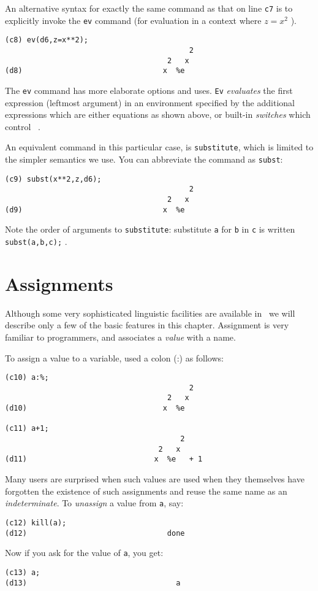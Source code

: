 An alternative syntax for exactly the same command as that on line {\tt c7}
is to explicitly invoke the {\tt ev} command (for evaluation in a context
where $ z = x^2 $ ).
\begin{verbatim}
(c8) ev(d6,z=x**2);
                                          2
                                     2   x
(d8)                                x  %e
\end{verbatim}

The {\tt ev} command has more elaborate options and uses. {\tt Ev} 
{\it evaluates} the first expression (leftmost argument) in an environment 
specified by the additional expressions which are either equations as shown 
above, or built-in {\it switches} which control \Max\ .

An equivalent command in this particular case, is {\tt substitute},
which is limited to the simpler semantics we use.  You can abbreviate
the command as {\tt subst}: 
\begin{verbatim}
(c9) subst(x**2,z,d6);
                                          2
                                     2   x
(d9)                                x  %e
\end{verbatim}
Note the order of arguments to {\tt substitute}: substitute {\tt a} for 
{\tt b} in {\tt c} is written {\tt subst(a,b,c);} .

\section{Assignments}

Although some very sophisticated linguistic facilities are available in \Max\,
we will describe only a few of the basic features in this chapter.
Assignment is very familiar to programmers, and associates a {\it value}
with a name.

To assign a value to a variable, used a colon (:) as follows:
\begin{verbatim}
(c10) a:%;
                                          2
                                     2   x
(d10)                               x  %e

(c11) a+1;
                                        2
                                   2   x
(d11)                             x  %e   + 1
\end{verbatim}

Many users are surprised when such values are
used when they themselves have forgotten the existence of such
assignments and reuse the same name as an {\it indeterminate}.
To {\it unassign} a value from {\tt a}, say:
\begin{verbatim}
(c12) kill(a);
(d12)                                done
\end{verbatim}
Now if you ask for the value of {\tt a}, you get:
\begin{verbatim}
(c13) a;
(d13)                                  a
\end{verbatim}

